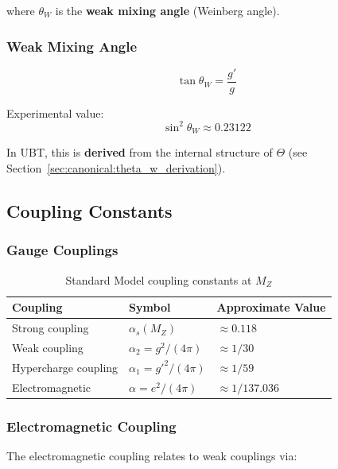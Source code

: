 where $\theta_W$ is the \textbf{weak mixing angle} (Weinberg angle).

\subsubsection{Weak Mixing Angle}

\begin{equation}
\label{eq:canonical:weinberg_angle}
\tan\theta_W = \frac{g'}{g}
\end{equation}

Experimental value:
\begin{equation}
\sin^2\theta_W \approx 0.23122
\end{equation}

In UBT, this is \textbf{derived} from the internal structure of $\Theta$ (see Section~\ref{sec:canonical:theta_w_derivation}).

\subsection{Coupling Constants}

\subsubsection{Gauge Couplings}

\begin{table}[h]
\centering
\begin{tabular}{|l|l|l|}
\hline
\textbf{Coupling} & \textbf{Symbol} & \textbf{Approximate Value} \\
\hline
Strong coupling & $\alpha_s(M_Z)$ & $\approx 0.118$ \\
Weak coupling & $\alpha_2 = g^2/(4\pi)$ & $\approx 1/30$ \\
Hypercharge coupling & $\alpha_1 = g'^2/(4\pi)$ & $\approx 1/59$ \\
Electromagnetic & $\alpha = e^2/(4\pi)$ & $\approx 1/137.036$ \\
\hline
\end{tabular}
\caption{Standard Model coupling constants at $M_Z$}
\label{tab:canonical:sm_couplings}
\end{table}

\subsubsection{Electromagnetic Coupling}

The electromagnetic coupling relates to weak couplings via:

